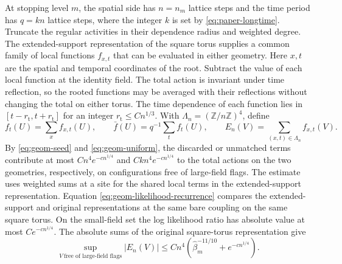 \documentclass[11pt,a4paper]{article}
\numberwithin{equation}{section}
\begin{document}
At stopping level \(m\), the spatial side has \(n=n_m\) lattice steps and the time period has \(q=kn\) lattice steps, where the integer \(k\) is set by \eqref{eq:paper-longtime}. Truncate the regular activities in their dependence radius and weighted degree. The extended-support representation of the square torus supplies a common family of local functions \(f_{x,t}\) that can be evaluated in either geometry. Here \(x,t\) are the spatial and temporal coordinates of the root. Subtract the value of each local function at the identity field. The total action is invariant under time reflection, so the rooted functions may be averaged with their reflections without changing the total on either torus. The time dependence of each function lies in \([t-r_{\mathrm t},t+r_{\mathrm t}]\) for an integer \(r_{\mathrm t}\le Cn^{1/3}\). With \(\Lambda_n=(\mathbb Z/n\mathbb Z)^4\), define
\[
 f_t(U)=\sum_x f_{x,t}(U),\qquad
 \bar f(U)=q^{-1}\sum_t f_t(U),\qquad
 E_n(V)=\sum_{(x,t)\in\Lambda_n}f_{x,t}(V).
\]
By \eqref{eq:geom-seed} and \eqref{eq:geom-uniform}, the discarded or unmatched terms contribute at most \(Cn^4e^{-c n^{1/4}}\) and \(Ckn^4e^{-c n^{1/4}}\) to the total actions on the two geometries, respectively, on configurations free of large-field flags. The estimate uses weighted sums at a site for the shared local terms in the extended-support representation. Equation \eqref{eq:geom-likelihood-recurrence} compares the extended-support and original representations at the same bare coupling on the same square torus. On the small-field set the log likelihood ratio has absolute value at most \(Ce^{-c n^{1/4}}\). The absolute sums of the original square-torus representation give
\begin{equation}
 \sup_{V\ \text{free of large-field flags}}|E_n(V)|
 \le Cn^4(\widehat\beta_m^{-11/10}+e^{-c n^{1/4}}) .
 \label{eq:geom-folded-box}
\end{equation}
\end{document}

